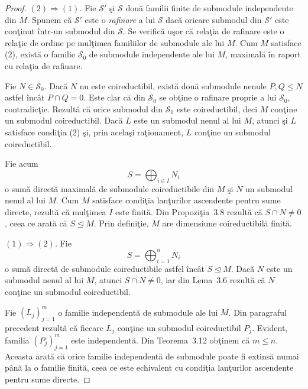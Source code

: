 \documentclass[12pt,a4paper]{book}
\newcommand{\ess}{\trianglelefteq}  %
\theoremstyle{plain}
\theoremstyle{definition}
\theoremstyle{remark}
\begin{document}
\begin{proof}
\emph{\((2) \Rightarrow (1)\).}
Fie \(\mathcal{S}'\) şi \(\mathcal{S}\) două familii finite de submodule
independente din \(M\).
Spunem că \(\mathcal{S}'\) este o \emph{rafinare} a lui \(\mathcal{S}\) dacă
oricare submodul din \(\mathcal{S}'\) este conţinut într-un submodul din
\(\mathcal{S}\).
Se verifică uşor că relaţia de rafinare este o relaţie de ordine pe
mulţimea familiilor de submodule ale lui \(M\).
Cum \(M\) satisface (2), există o familie \(\mathcal{S}_0\) de submodule
independente ale lui \(M\), maximală în raport cu relaţia de rafinare.

Fie \(N \in \mathcal{S}_0\).
Dacă \(N\) nu este coireductibil, există două submodule nenule
\(P,Q \leq N\) astfel încât \(P \cap Q = 0\).
Este clar că din \(\mathcal{S}_0\) se obţine o rafinare proprie a lui
\(\mathcal{S}_0\), contradicţie.
Rezultă că orice submodul din \(\mathcal{S}_0\) este coireductibil, deci
\(M\) conţine un submodul coireductibil.
Dacă \(L\) este un submodul nenul al lui \(M\), atunci şi \(L\) satisface
condiţia (2) şi, prin acelaşi raţionament, \(L\) conţine un submodul
coireductibil.

Fie acum
\[
S = \bigoplus_{i\in I} N_i
\]
o sumă directă maximală de submodule coireductibile din \(M\) şi
\(N\) un submodul nenul al lui \(M\).
Cum \(M\) satisface condiţia lanţurilor ascendente pentru sume directe,
rezultă că mulţimea \(I\) este finită.
Din Propoziţia~3.8 rezultă că \(S \cap N \neq 0\), ceea ce arată că
\(S \ess M\).
Prin definiţie, \(M\) are dimensiune coireductibilă finită.

\medskip
\emph{\((1) \Rightarrow (2)\).}
Fie
\[
S = \bigoplus_{i=1}^n N_i
\]
o sumă directă de submodule coireductibile astfel încât \(S \ess M\).
Dacă \(N\) este un submodul nenul al lui \(M\), atunci \(S \cap N \neq 0\),
iar din Lema~3.6 rezultă că \(N\) conţine un submodul coireductibil.

Fie \((L_j)_{j=1}^m\) o familie independentă de submodule ale lui \(M\).
Din paragraful precedent rezultă că fiecare \(L_j\) conţine un submodul
coireductibil \(P_j\).
Evident, familia \((P_j)_{j=1}^m\) este independentă.
Din Teorema~3.12 obţinem că \(m \leq n\).
Aceasta arată că orice familie independentă de submodule poate fi extinsă
numai până la o familie finită, ceea ce este echivalent cu condiţia
lanţurilor ascendente pentru sume directe.
\end{proof}
\end{document}
